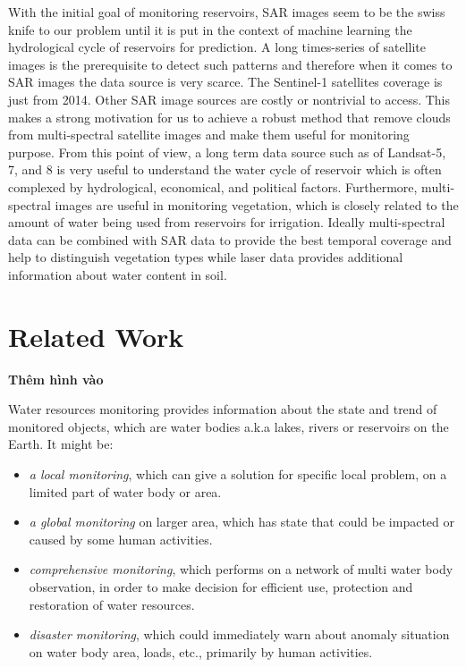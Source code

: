 With the initial goal of monitoring reservoirs, SAR images seem to be the swiss knife to our problem until it is put in the context of machine learning the hydrological cycle of reservoirs for prediction. A long times-series of satellite images is the prerequisite to detect such patterns and therefore when it comes to SAR images the data source is very scarce. The Sentinel-1 satellites coverage is just from 2014. Other SAR image sources are costly or nontrivial to access. This makes a strong motivation for us to achieve a robust  method that remove clouds from multi-spectral satellite images and make them useful for monitoring purpose. From this point of view, a long term data source such as of Landsat-5, 7, and 8 is very useful to understand the water cycle of reservoir which is often complexed by hydrological, economical, and political factors. Furthermore, multi-spectral images are useful in monitoring vegetation, which is closely related to the amount of water being used from reservoirs for irrigation. Ideally multi-spectral data can be combined with SAR data to provide the best temporal coverage and help to distinguish vegetation types while laser data provides additional information about water content in soil. 


\section{Related Work} %

\textbf{Thêm hình vào}


Water resources monitoring provides information about the state and trend of monitored objects, which are water bodies a.k.a lakes, rivers or reservoirs on the Earth. It might be:

\begin{itemize}
	\item \textit{a local monitoring}, which can give a solution for specific local problem, on a limited part of water body or area.
	\item \textit{a global monitoring} on larger area, which has state that could be impacted or caused by some human activities.
	\item \textit{comprehensive monitoring}, which performs on a network of multi water body observation, in order to make decision for efficient use, protection and restoration of water resources.
	\item \textit{disaster monitoring}, which could immediately warn about anomaly situation on water body area, loads, etc., primarily by human activities.
\end{itemize}

